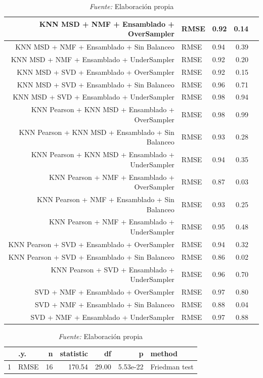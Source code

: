 \begin{table}[H]
\begin{tabular}{rllrr}
        KNN MSD + NMF + Ensamblado + OverSampler & RMSE & 0.92 & 0.14 \\ \hline
        KNN MSD + NMF + Ensamblado + Sin Balanceo & RMSE & 0.94 & 0.39 \\ \hline
        KNN MSD + NMF + Ensamblado + UnderSampler & RMSE & 0.92 & 0.20 \\ \hline
        KNN MSD + SVD + Ensamblado + OverSampler & RMSE & 0.92 & 0.15 \\ \hline
        KNN MSD + SVD + Ensamblado + Sin Balanceo & RMSE & 0.96 & 0.71 \\ \hline
        KNN MSD + SVD + Ensamblado + UnderSampler & RMSE & 0.98 & 0.94 \\ \hline
        KNN Pearson + KNN MSD + Ensamblado + OverSampler & RMSE & 0.98 & 0.99 \\ \hline
        KNN Pearson + KNN MSD + Ensamblado + Sin Balanceo & RMSE & 0.93 & 0.28 \\ \hline
        KNN Pearson + KNN MSD + Ensamblado + UnderSampler & RMSE & 0.94 & 0.35 \\ \hline
        KNN Pearson + NMF + Ensamblado + OverSampler & RMSE & 0.87 & 0.03 \\ \hline
        KNN Pearson + NMF + Ensamblado + Sin Balanceo & RMSE & 0.93 & 0.25 \\ \hline
        KNN Pearson + NMF + Ensamblado + UnderSampler & RMSE & 0.95 & 0.48 \\ \hline
        KNN Pearson + SVD + Ensamblado + OverSampler & RMSE & 0.94 & 0.32 \\ \hline
        KNN Pearson + SVD + Ensamblado + Sin Balanceo & RMSE & 0.86 & 0.02 \\ \hline
        KNN Pearson + SVD + Ensamblado + UnderSampler & RMSE & 0.96 & 0.70 \\ \hline
        SVD + NMF + Ensamblado + OverSampler & RMSE & 0.97 & 0.80 \\ \hline
        SVD + NMF + Ensamblado + Sin Balanceo & RMSE & 0.88 & 0.04 \\ \hline
        SVD + NMF + Ensamblado + UnderSampler & RMSE & 0.97 & 0.88 \\ \hline
    \end{tabular}
\caption*{\small\textit{Fuente:} Elaboración propia}
\end{table}

\begin{table}[H]
\caption{Resultados de la prueba de Friedman a los modelos con sus variantes de balanceo}
\label{tab:friedman_test_results_hp3}
\centering
\begin{tabular}{rlrrrrl}
 \hline
 & .y. & n & statistic & df & p & method \\ 
  \hline
1 & RMSE &  16 & 170.54 & 29.00 & 5.53e-22 & Friedman test \\ 
   \hline
\end{tabular}
\caption*{\small\textit{Fuente:} Elaboración propia}
\end{table}

